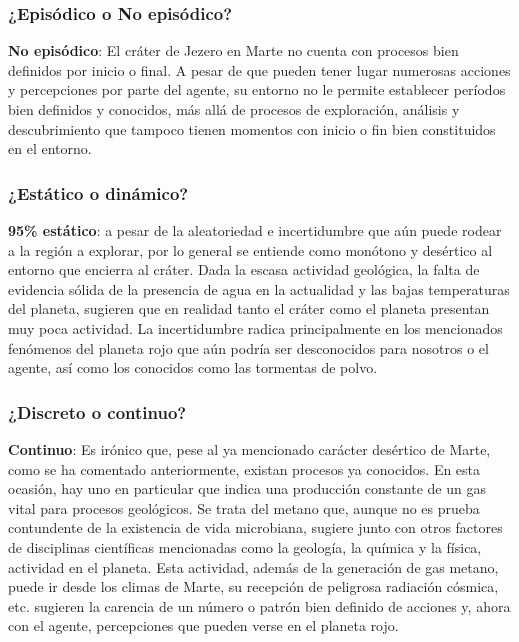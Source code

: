 \documentclass[12pt, letterpaper]{article}
\begin{document}
        \subsubsection{¿Episódico o No episódico?}

        \textbf{No episódico}: El cráter de Jezero en Marte no cuenta con procesos bien definidos por inicio o final. A pesar de que pueden tener lugar numerosas acciones y percepciones por parte del agente, su entorno no le permite establecer períodos bien definidos y conocidos, más allá de procesos de exploración, análisis y descubrimiento que tampoco tienen momentos con inicio o fin bien constituidos en el entorno.
        
        \subsubsection{¿Estático o dinámico?}

        \textbf{95\% estático}: a pesar de la aleatoriedad e incertidumbre que aún puede rodear a la región a explorar, por lo general se entiende como monótono y desértico al entorno que encierra al cráter. Dada la escasa actividad geológica, la falta de evidencia sólida de la presencia de agua en la actualidad y las bajas temperaturas del planeta, sugieren que en realidad tanto el cráter como el planeta presentan muy poca actividad. La incertidumbre radica principalmente en los mencionados fenómenos del planeta rojo que aún podría ser desconocidos para nosotros o el agente, así como los conocidos como las tormentas de polvo.
    
        \subsubsection{¿Discreto o continuo?}

        \textbf{Continuo}: Es irónico que, pese al ya mencionado carácter desértico de Marte, como se ha comentado anteriormente, existan procesos ya conocidos. En esta ocasión, hay uno en particular que indica una producción constante de un gas vital para procesos geológicos. Se trata del metano que, aunque no es prueba contundente de la existencia de vida microbiana, sugiere junto con otros factores de disciplinas científicas mencionadas como la geología, la química y la física, actividad en el planeta. Esta actividad, además de la generación de gas metano, puede ir desde los climas de Marte, su recepción de peligrosa radiación cósmica\cite{campillo2021arquitecturas}, etc. sugieren la carencia de un número o patrón bien definido de acciones y, ahora con el agente, percepciones que pueden verse en el planeta rojo.
    
\end{document}
